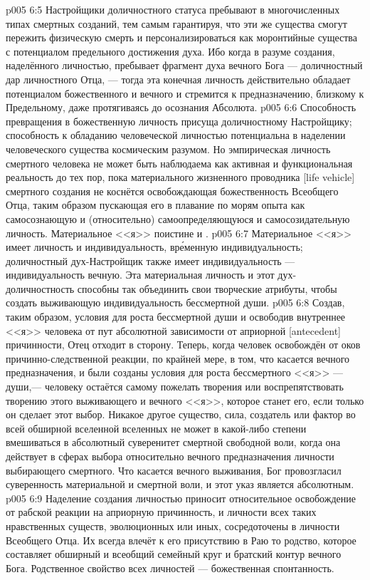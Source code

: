 \vs p005 6:5 \pc Настройщики доличностного статуса пребывают в многочисленных типах смертных созданий, тем самым гарантируя, что эти же существа смогут пережить физическую смерть и персонализироваться как моронтийные существа с потенциалом предельного достижения духа. Ибо когда в разуме создания, наделённого личностью, пребывает фрагмент духа вечного Бога --- доличностный дар личностного Отца, --- тогда эта конечная личность действительно обладает потенциалом божественного и вечного и стремится к предназначению, близкому к Предельному, даже протягиваясь до осознания Абсолюта.
\vs p005 6:6 Способность превращения в божественную личность присуща доличностному Настройщику; способность к обладанию человеческой личностью потенциальна в наделении человеческого существа космическим разумом. Но эмпирическая личность смертного человека не может быть наблюдаема как активная и функциональная реальность до тех пор, пока материального жизненного проводника [life vehicle] смертного создания не коснётся освобождающая божественность Всеобщего Отца, таким образом пускающая его в плавание по морям опыта как самосознающую и (относительно) самоопределяющуюся и самосозидательную личность. Материальное <<я>> поистине и .
\vs p005 6:7 \pc Материальное <<я>> имеет личность и индивидуальность, вр\'еменную индивидуальность; доличностный дух\hyp{}Настройщик также имеет индивидуальность --- индивидуальность вечную. Эта материальная личность и этот дух\hyp{}доличностность способны так объединить свои творческие атрибуты, чтобы создать выживающую индивидуальность бессмертной души.
\vs p005 6:8 Создав, таким образом, условия для роста бессмертной души и освободив внутреннее <<я>> человека от пут абсолютной зависимости от априорной [antecedent] причинности, Отец отходит в сторону. Теперь, когда человек освобождён от оков причинно\hyp{}следственной реакции, по крайней мере, в том, что касается вечного предназначения, и были созданы условия для роста бессмертного <<я>> --- души,--- человеку остаётся самому пожелать творения или воспрепятствовать творению этого выживающего и вечного <<я>>, которое станет его, если только он сделает этот выбор. Никакое другое существо, сила, создатель или фактор во всей обширной вселенной вселенных не может в какой\hyp{}либо степени вмешиваться в абсолютный суверенитет смертной свободной воли, когда она действует в сферах выбора относительно вечного предназначения личности выбирающего смертного. Что касается вечного выживания, Бог провозгласил суверенность материальной и смертной воли, и этот указ является абсолютным.
\vs p005 6:9 \pc Наделение создания личностью приносит относительное освобождение от рабской реакции на априорную причинность, и личности всех таких нравственных существ, эволюционных или иных, сосредоточены в личности Всеобщего Отца. Их всегда влечёт к его присутствию в Раю то родство, которое составляет обширный и всеобщий семейный круг и братский контур вечного Бога. Родственное свойство всех личностей --- божественная спонтанность.
